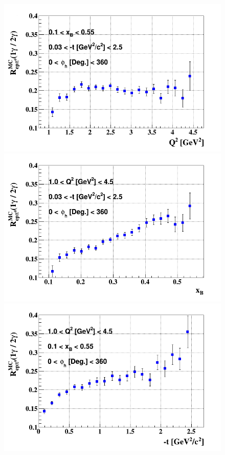\begin{figure}[tp]
\centering
\includegraphics[scale=0.30]{fig_dvcs/epgamma_eppi0_Q2.png}
\includegraphics[scale=0.30]{fig_dvcs/epgamma_eppi0_xB.png}
\includegraphics[scale=0.30]{fig_dvcs/epgamma_eppi0_t.png}

\end{figure}
